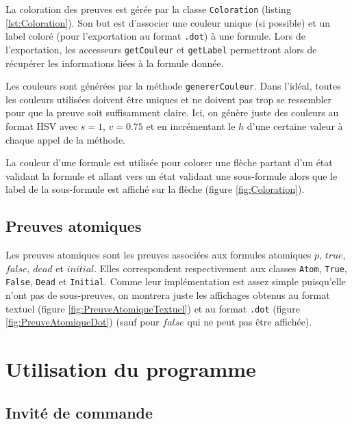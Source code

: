 \documentclass[dvipsnames]{report}
\begin{document}
La coloration des preuves est gérée par la classe \texttt{Coloration} (listing \ref{lst:Coloration}). Son but est d'associer une couleur unique (si possible) et un label coloré (pour l'exportation au format \texttt{.dot}) à une formule. Lors de l'exportation, les accesseurs \texttt{getCouleur} et \texttt{getLabel} permettront alors de récupérer les informations liées à la formule donnée.

Les couleurs sont générées par la méthode \texttt{genererCouleur}. Dans l'idéal, toutes les couleurs utilisées doivent être uniques et ne doivent pas trop se ressembler pour que la preuve soit suffisamment claire. Ici, on génère juste des couleurs au format HSV avec $s=1$, $v=0.75$ et en incrémentant le $h$ d'une certaine valeur à chaque appel de la méthode.

La couleur d'une formule est utilisée pour colorer une flèche partant d'un état validant la formule et allant vers un état validant une sous-formule alors que le label de la sous-formule est affiché sur la flèche (figure \ref{fig:Coloration}).



\subsection{Preuves atomiques}

Les preuves atomiques sont les preuves associées aux formules atomiques $p$, $true$, $false$, $dead$ et $initial$. Elles correspondent respectivement aux classes \texttt{Atom}, \texttt{True}, \texttt{False}, \texttt{Dead} et \texttt{Initial}. Comme leur implémentation est assez simple puisqu'elle n'ont pas de sous-preuves, on montrera juste les affichages obtenus au format textuel (figure \ref{fig:PreuveAtomiqueTextuel}) et au format \texttt{.dot} (figure \ref{fig:PreuveAtomiqueDot}) (sauf pour $false$ qui ne peut pas être affichée).





\section{Utilisation du programme}

\subsection{Invité de commande}
\end{document}
